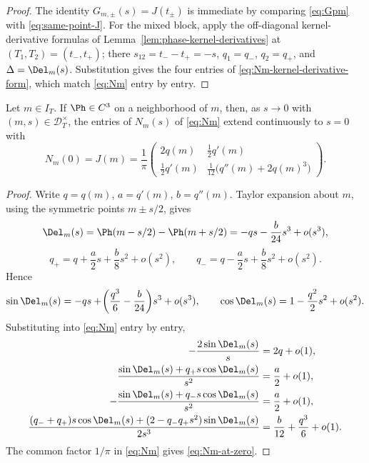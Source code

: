 \begin{proof}
The identity \(G_{m,\pm}(s) = J(t_\pm)\) is immediate by comparing
\eqref{eq:Gpm} with \eqref{eq:same-point-J}.  For the mixed block,
apply the off-diagonal kernel-derivative formulas of
Lemma~\ref{lem:phase-kernel-derivatives} at
\((T_1, T_2) = (t_-, t_+)\); there \(s_{12} = t_- - t_+ = -s\),
\(q_1 = q_-\), \(q_2 = q_+\), and \(\Delta = \Del_m(s)\).
Substitution gives the four entries of
\eqref{eq:Nm-kernel-derivative-form}, which match \eqref{eq:Nm} entry
by entry.
\end{proof}

\begin{lemma}
\label{lem:Nm-removable-singularity}
Let \(m\in I_T\).  If \(\Ph\in C^3\) on a neighborhood of \(m\), then,
as \(s\to0\) with \((m,s)\in\mathcal D_T^\times\), the entries of
\(N_m(s)\) of \eqref{eq:Nm} extend continuously to \(s=0\) with
\begin{equation}
\label{eq:Nm-at-zero}
        N_m(0) = J(m)
        = \frac1\pi
        \begin{pmatrix}
        2q(m) & \tfrac12 q'(m)\\[0.8ex]
        \tfrac12 q'(m) & \tfrac1{12}\bigl(q''(m)+2q(m)^3\bigr)
        \end{pmatrix}.
\end{equation}
\end{lemma}

\begin{proof}
Write \(q = q(m)\), \(a = q'(m)\), \(b = q''(m)\).  Taylor expansion
about \(m\), using the symmetric points \(m\pm s/2\), gives
\[
        \Del_m(s)
        = \Ph(m-s/2)-\Ph(m+s/2)
        = -qs - \frac{b}{24}s^3 + o(s^3),
\]
\[
        q_+ = q + \frac{a}{2}s + \frac{b}{8}s^2 + o(s^2),
        \qquad
        q_- = q - \frac{a}{2}s + \frac{b}{8}s^2 + o(s^2).
\]
Hence
\[
        \sin\Del_m(s)
        = -qs + \!\left(\frac{q^3}{6}-\frac{b}{24}\right)\!s^3
          + o(s^3),
        \qquad
        \cos\Del_m(s) = 1 - \frac{q^2}{2}s^2 + o(s^2).
\]
Substituting into \eqref{eq:Nm} entry by entry,
\begin{align*}
        -\frac{2\sin\Del_m(s)}{s}
        &= 2q + o(1),\\
        \frac{\sin\Del_m(s)+q_+ s\cos\Del_m(s)}{s^2}
        &= \frac{a}{2} + o(1),\\
        -\frac{\sin\Del_m(s)+q_- s\cos\Del_m(s)}{s^2}
        &= \frac{a}{2} + o(1),\\
        \frac{(q_-+q_+)s\cos\Del_m(s)+(2-q_- q_+ s^2)\sin\Del_m(s)}{2s^3}
        &= \frac{b}{12}+\frac{q^3}{6}+o(1).
\end{align*}
The common factor \(1/\pi\) in \eqref{eq:Nm} gives
\eqref{eq:Nm-at-zero}.
\end{proof}

